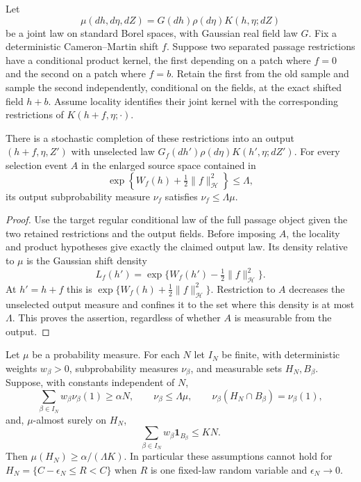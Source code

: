 \begin{lemma}
\label{comp:restricted-cm-transfer}
Let
\[
 \mu(dh,d\eta,dZ)=G(dh)\rho(d\eta)K(h,\eta;dZ)
\]
be a joint law on standard Borel spaces, with Gaussian real field
law $G$.  Fix a deterministic Cameron--Martin shift $f$.
Suppose two separated passage restrictions have a conditional
product kernel, the first depending on a patch where $f=0$ and
the second on a patch where $f=b$.  Retain the first from the
old sample and sample the second independently, conditional on
the fields, at the exact shifted field $h+b$.
Assume locality identifies their joint kernel with the
corresponding restrictions of $K(h+f,\eta;\cdot)$.

There is a stochastic completion of these restrictions into
an output $(h+f,\eta,Z')$ with unselected law
$G_f(dh')\rho(d\eta)K(h',\eta;dZ')$.
For every selection event $A$ in the enlarged source space
contained in
\[
 \exp\left\{W_f(h)+\tfrac12\|f\|_{\mathcal H}^2\right\}
 \le\Lambda,
\]
its output subprobability measure $\nu_f$ satisfies
$\nu_f\le\Lambda\mu$.
\end{lemma}

\begin{proof}
Use the target regular conditional law of the full passage
object given the two retained restrictions and the output
fields.  Before imposing $A$, the locality and product
hypotheses give exactly the claimed output law.  Its density
relative to $\mu$ is the Gaussian shift density
\[
 L_f(h')=\exp\{W_f(h')-\tfrac12\|f\|_{\mathcal H}^2\}.
\]
At $h'=h+f$ this is
$\exp\{W_f(h)+\tfrac12\|f\|_{\mathcal H}^2\}$.
Restriction to $A$ decreases the unselected output measure
and confines it to the set where this density is at most
$\Lambda$.  This proves the assertion, regardless of whether
$A$ is measurable from the output.
\end{proof}

\begin{lemma}
\label{comp:weighted-output-multiplicity}
Let $\mu$ be a probability measure.  For each $N$ let $I_N$
be finite, with deterministic weights $w_\beta>0$,
subprobability measures $\nu_\beta$, and measurable sets
$H_N,B_\beta$.  Suppose, with constants independent of $N$,
\[
 \sum_{\beta\in I_N}w_\beta\nu_\beta(1)\ge\alpha N,
 \qquad
 \nu_\beta\le\Lambda\mu,
 \qquad
 \nu_\beta(H_N\cap B_\beta)=\nu_\beta(1),
\]
and, $\mu$-almost surely on $H_N$,
\[
 \sum_{\beta\in I_N}w_\beta\mathbf 1_{B_\beta}\le K N.
\]
Then $\mu(H_N)\ge\alpha/(\Lambda K)$.
In particular these assumptions cannot hold for
$H_N=\{C-\epsilon_N\le R<C\}$ when $R$ is one fixed-law
random variable and $\epsilon_N\to0$.
\end{lemma}

